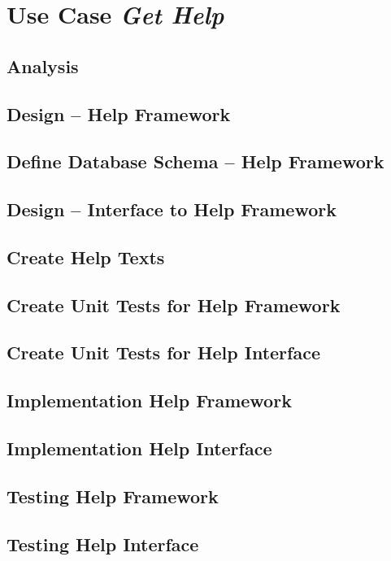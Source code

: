 \documentclass[11pt]{article}
\author{Mikael Svahnberg}
\date{\today}
\title{}
\begin{document}
\tableofcontents


\section{Use Case \emph{Get Help}}
\label{sec:orgc9047be}
\subsection{Analysis}
\label{sec:org899eaf8}
\subsection{Design -- Help Framework}
\label{sec:orgee42cd0}
\subsection{Define Database Schema -- Help Framework}
\label{sec:orga76645d}
\subsection{Design -- Interface to Help Framework}
\label{sec:org9902801}
\subsection{Create Help Texts}
\label{sec:org78fdfc4}
\subsection{Create Unit Tests for Help Framework}
\label{sec:org0a155ee}
\subsection{Create Unit Tests for Help Interface}
\label{sec:org9068da0}
\subsection{Implementation Help Framework}
\label{sec:orgdca096e}
\subsection{Implementation Help Interface}
\label{sec:org027d5ae}
\subsection{Testing Help Framework}
\label{sec:orgc736370}
\subsection{Testing Help Interface}
\label{sec:orge945ba1}
\end{document}
